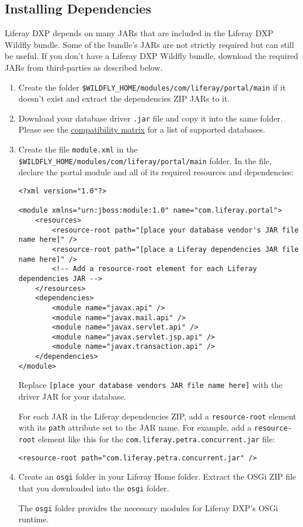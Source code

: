 \subsection{Installing Dependencies}\label{installing-dependencies-1}

Liferay DXP depends on many JARs that are included in the Liferay DXP
Wildfly bundle. Some of the bundle's JARs are not strictly required but
can still be useful. If you don't have a Liferay DXP Wildfly bundle,
download the required JARs from third-parties as described below.

\begin{enumerate}
\def\labelenumi{\arabic{enumi}.}
\item
  Create the folder
  \texttt{\$WILDFLY\_HOME/modules/com/liferay/portal/main} if it doesn't
  exist and extract the dependencies ZIP JARs to it.
\item
  Download your database driver \texttt{.jar} file and copy it into the
  same folder. Please see the
  \href{https://web.liferay.com/documents/14/21598941/Liferay+DXP+7.1+Compatibility+Matrix/9f9c917a-c620-427b-865d-5c4b4a00be85}{compatibility
  matrix} for a list of supported databases.
\item
  Create the file \texttt{module.xml} in the
  \texttt{\$WILDFLY\_HOME/modules/com/liferay/portal/main} folder. In
  the file, declare the portal module and all of its required resources
  and dependencies:

\begin{verbatim}
<?xml version="1.0"?>

<module xmlns="urn:jboss:module:1.0" name="com.liferay.portal">
    <resources>
        <resource-root path="[place your database vendor's JAR file name here]" />
        <resource-root path="[place a Liferay dependencies JAR file name here]" />
        <!-- Add a resource-root element for each Liferay dependencies JAR -->
    </resources>
    <dependencies>
        <module name="javax.api" />
        <module name="javax.mail.api" />
        <module name="javax.servlet.api" />
        <module name="javax.servlet.jsp.api" />
        <module name="javax.transaction.api" />
    </dependencies>
</module>
\end{verbatim}

  Replace
  \texttt{{[}place\ your\ database\ vendor\textquotesingle{}s\ JAR\ file\ name\ here{]}}
  with the driver JAR for your database.

  For each JAR in the Liferay dependencies ZIP, add a
  \texttt{resource-root} element with its \texttt{path} attribute set to
  the JAR name. For example, add a \texttt{resource-root} element like
  this for the \texttt{com.liferay.petra.concurrent.jar} file:

\begin{verbatim}
<resource-root path="com.liferay.petra.concurrent.jar" />
\end{verbatim}
\item
  Create an \texttt{osgi} folder in your Liferay Home folder. Extract
  the OSGi ZIP file that you downloaded into the \texttt{osgi} folder.

  The \texttt{osgi} folder provides the necessary modules for Liferay
  DXP's OSGi runtime.
\end{enumerate}

